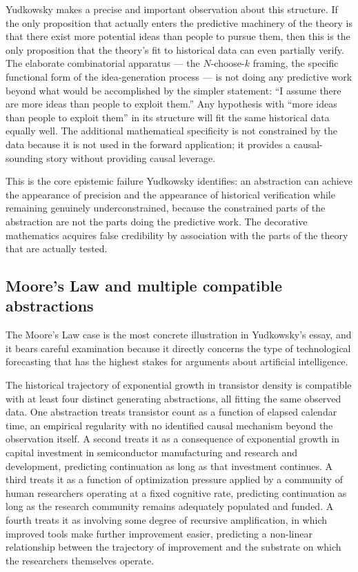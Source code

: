 \documentclass[12pt, a4paper]{article}
\theoremstyle{plain}
\theoremstyle{definition}
\theoremstyle{remark}
\begin{document}
Yudkowsky makes a precise and important observation about this structure.
If the only proposition that actually enters the predictive machinery of the theory is
that there exist more potential ideas than people to pursue them, then this is the only
proposition that the theory's fit to historical data can even partially verify.
The elaborate combinatorial apparatus — the $N$-choose-$k$ framing, the specific
functional form of the idea-generation process — is not doing any predictive work
beyond what would be accomplished by the simpler statement: ``I assume there are more
ideas than people to exploit them.''
Any hypothesis with ``more ideas than people to exploit them'' in its structure will
fit the same historical data equally well.
The additional mathematical specificity is not constrained by the data because it is
not used in the forward application; it provides a causal-sounding story without
providing causal leverage.

This is the core epistemic failure Yudkowsky identifies: an abstraction can achieve
the appearance of precision and the appearance of historical verification while
remaining genuinely underconstrained, because the constrained parts of the abstraction
are not the parts doing the predictive work.
The decorative mathematics acquires false credibility by association with the parts of
the theory that are actually tested.

\subsection{Moore's Law and multiple compatible abstractions}

The Moore's Law case is the most concrete illustration in Yudkowsky's essay, and it
bears careful examination because it directly concerns the type of technological
forecasting that has the highest stakes for arguments about artificial intelligence.

The historical trajectory of exponential growth in transistor density is compatible
with at least four distinct generating abstractions, all fitting the same observed
data.
One abstraction treats transistor count as a function of elapsed calendar time, an
empirical regularity with no identified causal mechanism beyond the observation itself.
A second treats it as a consequence of exponential growth in capital investment in
semiconductor manufacturing and research and development, predicting continuation as
long as that investment continues.
A third treats it as a function of optimization pressure applied by a community of
human researchers operating at a fixed cognitive rate, predicting continuation as long
as the research community remains adequately populated and funded.
A fourth treats it as involving some degree of recursive amplification, in which
improved tools make further improvement easier, predicting a non-linear relationship
between the trajectory of improvement and the substrate on which the researchers
themselves operate.
\end{document}
